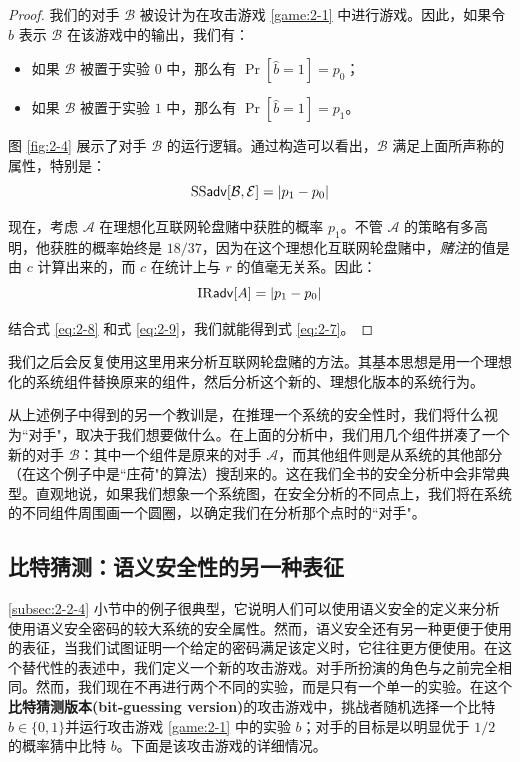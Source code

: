 \begin{proof}
我们的对手 $\mathcal{B}$ 被设计为在攻击游戏 \ref{game:2-1} 中进行游戏。因此，如果令 $\hat b$ 表示 $\mathcal{B}$ 在该游戏中的输出，我们有：
\begin{itemize}
	\item 如果 $\mathcal{B}$ 被置于实验 $0$ 中，那么有 $\Pr[\hat b=1]=p_0$；
	\item 如果 $\mathcal{B}$ 被置于实验 $1$ 中，那么有 $\Pr[\hat b=1]=p_1$。
\end{itemize}
图 \ref{fig:2-4} 展示了对手 $\mathcal{B}$ 的运行逻辑。通过构造可以看出，$\mathcal{B}$ 满足上面所声称的属性，特别是：
\begin{equation}\label{eq:2-8}
{\rm SS\mathsf{adv}}[\mathcal{B},\mathcal{E}]=|p_1-p_0|
\end{equation}

现在，考虑 $\mathcal{A}$ 在理想化互联网轮盘赌中获胜的概率 $p_1$。不管 $\mathcal{A}$ 的策略有多高明，他获胜的概率始终是 $18/37$，因为在这个理想化互联网轮盘赌中，\emph{赌注}的值是由 $c$ 计算出来的，而 $c$ 在统计上与 $r$ 的值毫无关系。因此：
\begin{equation}\label{eq:2-9}
{\rm IR\mathsf{adv}}[A]=|p_1-p_0|
\end{equation}

结合式 \ref{eq:2-8} 和式 \ref{eq:2-9}，我们就能得到式 \ref{eq:2-7}。
\end{proof}

我们之后会反复使用这里用来分析互联网轮盘赌的方法。其基本思想是用一个理想化的系统组件替换原来的组件，然后分析这个新的、理想化版本的系统行为。

从上述例子中得到的另一个教训是，在推理一个系统的安全性时，我们将什么视为``对手"，取决于我们想要做什么。在上面的分析中，我们用几个组件拼凑了一个新的对手 $\mathcal{B}$：其中一个组件是原来的对手 $\mathcal{A}$，而其他组件则是从系统的其他部分（在这个例子中是``庄荷"的算法）搜刮来的。这在我们全书的安全分析中会非常典型。直观地说，如果我们想象一个系统图，在安全分析的不同点上，我们将在系统的不同组件周围画一个圆圈，以确定我们在分析那个点时的``对手"。

\subsection{比特猜测：语义安全性的另一种表征}\label{subsec:2-2-5}

\ref{subsec:2-2-4} 小节中的例子很典型，它说明人们可以使用语义安全的定义来分析使用语义安全密码的较大系统的安全属性。然而，语义安全还有另一种更便于使用的表征，当我们试图证明一个给定的密码满足该定义时，它往往更方便使用。在这个替代性的表述中，我们定义一个新的攻击游戏。对手所扮演的角色与之前完全相同。然而，我们现在不再进行两个不同的实验，而是只有一个单一的实验。在这个\textbf{比特猜测版本(bit-guessing version)}的攻击游戏中，挑战者随机选择一个比特 $b\in\{0,1\}$并运行攻击游戏 \ref{game:2-1} 中的实验 $b$；对手的目标是以明显优于 ${1}/{2}$ 的概率猜中比特 $b$。下面是该攻击游戏的详细情况。

